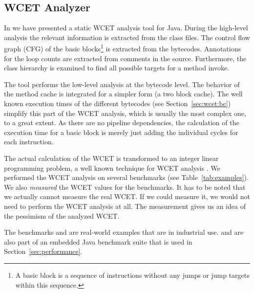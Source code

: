 \subsection{WCET Analyzer} \label{sec:wcet:java}

In \cite{jop:wcet:jtres06} we have presented a static WCET analysis
tool for Java. During the high-level analysis the relevant
information is extracted from the class files. The control flow graph
(CFG) of the basic blocks\footnote{A basic block is a sequence of
instructions without any jumps or jump targets within this sequence.}
is extracted from the bytecodes. Annotations for the loop counts are
extracted from comments in the source. Furthermore, the class
hierarchy is examined to find all possible targets for a method
invoke.

The tool performs the low-level analysis at the bytecode level. The
behavior of the method cache is integrated for a simpler form (a two
block cache). The well known execution times of the different
bytecodes (see Section~\ref{sec:wcet:bc}) simplify this part of the
WCET analysis, which is usually the most complex one, to a great
extent. As there are no pipeline dependencies, the calculation of the
execution time for a basic block is merely just adding the individual
cycles for each instruction.

The actual calculation of the WCET is transformed to an integer
linear programming problem, a well known technique for WCET analysis
\cite{Puschner:JRTS1997,216666}. We performed the WCET analysis on
several benchmarks (see Table~\ref{tab:examples}). We also
\emph{measured} the WCET values for the benchmarks. It has to be
noted that we actually cannot measure the real WCET. If we could
measure it, we would not need to perform the WCET analysis at all.
The measurement gives us an idea of the pessimism of the analyzed
WCET.
%
\begin{table}
    \caption{WCET benchmark examples}
    \label{tab:examples}
\end{table}
%
The benchmarks  and  are real-world examples
that are in industrial use.  and  are also part
of an embedded Java benchmark suite that is used in
Section~\ref{sec:performance}.

